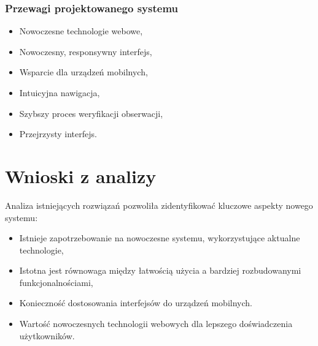 \subsubsection{Przewagi projektowanego systemu}
\begin{itemize}
	\item Nowoczesne technologie webowe,
	\item Nowoczesny, responsywny interfejs,
	\item Wsparcie dla urządzeń mobilnych,
	\item Intuicyjna nawigacja,
	\item Szybszy proces weryfikacji obserwacji,
	\item Przejrzysty interfejs.
\end{itemize}

\section{Wnioski z analizy}
Analiza istniejących rozwiązań pozwoliła zidentyfikować kluczowe aspekty nowego systemu:
\begin{itemize}
	\item Istnieje zapotrzebowanie na nowoczesne systemu, wykorzystujące aktualne technologie,
	\item Istotna jest równowaga między łatwością użycia a bardziej rozbudowanymi funkcjonalnościami,
	\item Konieczność dostosowania interfejsów do urządzeń mobilnych.
	\item Wartość nowoczesnych technologii webowych dla lepszego doświadczenia użytkowników.
\end{itemize}